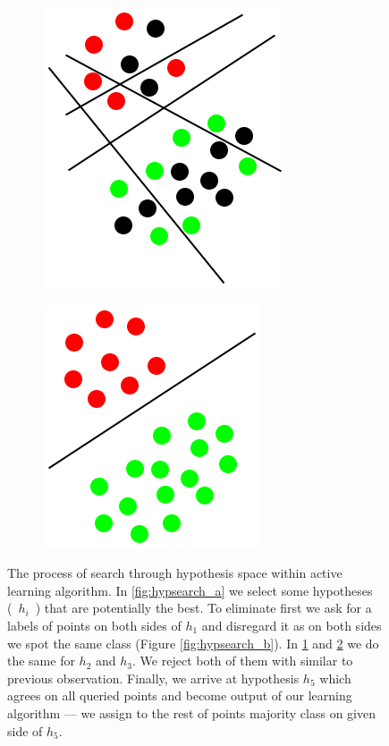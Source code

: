 \documentclass[12pt, a4paper, pdflatex, leqno, twoside]{report}
\begin{document}
\begin{figure}[htbp]
\begin{subfigure}[b]{0.3\textwidth}
    \caption{\label{fig:hypsearch_c}}
  \end{subfigure}
  \begin{subfigure}[b]{0.3\textwidth}
    \centering
    \includegraphics[width=0.5\linewidth]{graphics/hypsearch4.png}
    \caption{\label{fig:hypsearch_d}}
  \end{subfigure}
  \begin{subfigure}[b]{0.3\textwidth}
    \centering
    \includegraphics[width=0.5\linewidth]{graphics/hypsearch5.png}
    \caption{\label{fig:hypsearch_e}}
  \end{subfigure}
\begin{tiny}
\caption{The process of search through hypothesis space within active learning 
algorithm. In \ref{fig:hypsearch_a} we select some hypotheses (~$h_i$~) that 
are potentially the best. To eliminate first we ask for a labels of points on 
both sides of $h_1$ and disregard it as on both sides we spot the same class 
(Figure \ref{fig:hypsearch_b}). In \ref{fig:hypsearch_c} and 
\ref{fig:hypsearch_d} we do the same for $h_2$ and $h_3$. We reject both of 
them with similar to previous observation. Finally, we arrive at hypothesis 
$h_5$ which agrees on all queried points and become output of our learning 
algorithm --- we assign to the rest of points majority class on given side of 
$h_5$.\label{fig:hypsearch}}
\end{tiny}
\vspace{1cm}
\end{figure}
\end{document}
